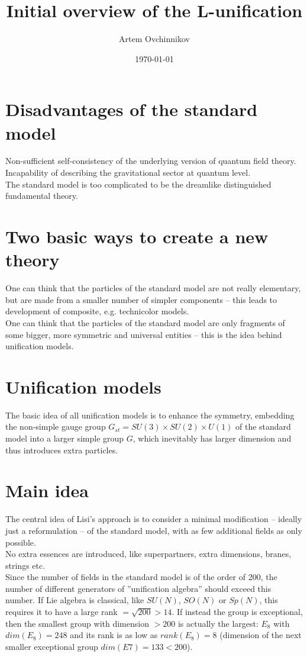 \documentclass{article}
\title{Initial overview of the L-unification}
\author{Artem Ovchinnikov}
\date{\today}
\begin{document}
\maketitle

\tableofcontents

\newpage
\section{Disadvantages of the standard model}
Non-sufficient self-consistency of the underlying version of quantum field theory. \\
Incapability of describing the gravitational sector at quantum level. \\
The standard model is too complicated to be the dreamlike distinguished fundamental theory. \\

\section{Two basic ways to create a new theory}
One can think that the particles of the standard model are not really elementary, but are made from a smaller number of simpler components – this leads to development of composite, e.g. technicolor models. \\
One can think that the particles of the standard model are only fragments of some bigger, more symmetric and universal entities – this is the idea behind unification models. \\

\section{Unification models}
The basic idea of all unification models is to enhance the symmetry, embedding the non-simple gauge group $ G_{st} = SU (3) \times SU (2) \times U (1) $ of the standard model into a larger simple group $G$, which inevitably has larger dimension and thus introduces extra particles.

\section{Main idea}
The central idea of Lisi’s approach is to consider a minimal modification – ideally just a reformulation – of the standard model, with as few additional fields as only possible. \\
No extra essences are introduced, like superpartners, extra dimensions, branes, strings etc. \\
Since the number of fields in the standard model is of the order of 200, the number of different generators of ”unification algebra” should exceed this number. If Lie algebra is classical, like $SU (N)$, $SO(N)$ or $Sp(N)$, this requires it to have a large rank $= \sqrt {200} > 14$. If instead the group is exceptional, then the smallest group with dimension $> 200$ is actually the largest: $E_8$ with $dim(E_8) = 248$ and its rank is as low as $rank(E_8) = 8$ (dimension of the next smaller exceptional group $dim(E7) = 133 < 200$).
\end{document}
